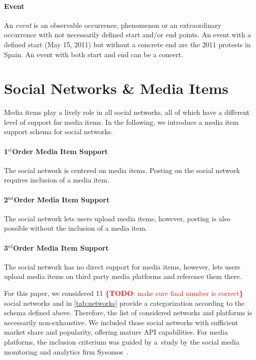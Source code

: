 \documentclass{acm_proc_article-sp}
\let\oldemph\emph
\renewcommand{\emph}[1]{\oldemph{\fontsize{9}{9}\selectfont #1}}
\newcommand{\todo}[1]{\noindent\textcolor{red}{{\bf \{TODO}: #1{\bf \}}}}
\newcommand{\superscript}[1]{\ensuremath{^{\textrm{#1}}}}
\newcommand{\st}[0]{\superscript{st}}
\newcommand{\nd}[0]{\superscript{nd}}
\newcommand{\rd}[0]{\superscript{rd}}
\begin{document}
\paragraph{Event}
An \emph{event} is an observable occurrence, phenomenon or an extraordinary occurrence with not necessarily defined start and/or end points.
An event with a defined start (May 15, 2011) but without a concrete end
are the 2011 protests in Spain.
An event with both start and end can be a concert.

\section{Social Networks \& Media Items}
Media items play a lively role in all social networks,
all of which have a different level of support for media items.
In the following, we introduce a media item support schema for social networks.

\paragraph{1\st Order Media Item Support}
The social network is centered on media items.
Posting on the social network requires inclusion of a media item.

\paragraph{2\nd Order Media Item Support}
The social network lets users upload media items, however,
posting is also possible without the inclusion of a media item.

\paragraph{3\rd Order Media Item Support}
The social network has no direct support for media items, however,
lets users upload media items on third party media platforms and reference them there.

For this paper, we considered 11 \todo{make sure final number is correct} social networks and in \autoref{tab:networks} provide a categorization according to the schema defined above.
Therefore, the list of considered networks and platforms is necessarily non-exhaustive.
We included those social networks with sufficient market share and popularity, offering mature API capabilities.
For media platforms, the inclusion criterium was guided by a~study by the social media monitoring and analytics firm Sysomos~\cite{Sysomos2011}.
\end{document}
